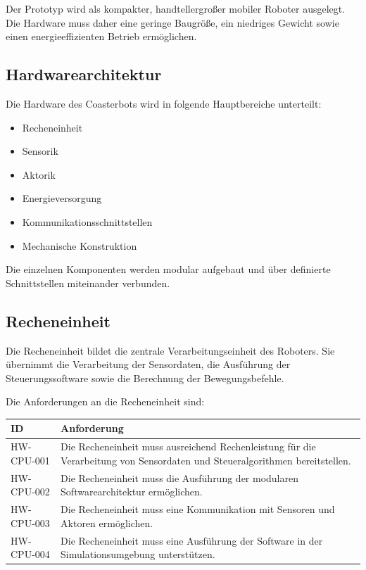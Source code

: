 Der Prototyp wird als kompakter, handtellergroßer mobiler Roboter
ausgelegt. Die Hardware muss daher eine geringe Baugröße, ein niedriges
Gewicht sowie einen energieeffizienten Betrieb ermöglichen.

\subsection{Hardwarearchitektur}\label{hardwarearchitektur}

Die Hardware des Coasterbots wird in folgende Hauptbereiche unterteilt:

\begin{itemize}
\tightlist
\item
  Recheneinheit
\item
  Sensorik
\item
  Aktorik
\item
  Energieversorgung
\item
  Kommunikationsschnittstellen
\item
  Mechanische Konstruktion
\end{itemize}

Die einzelnen Komponenten werden modular aufgebaut und über definierte
Schnittstellen miteinander verbunden.

\subsection{Recheneinheit}\label{recheneinheit}

Die Recheneinheit bildet die zentrale Verarbeitungseinheit des Roboters.
Sie übernimmt die Verarbeitung der Sensordaten, die Ausführung der
Steuerungssoftware sowie die Berechnung der Bewegungsbefehle.

Die Anforderungen an die Recheneinheit sind:

\begin{longtable}[]{@{}
  >{\raggedright\arraybackslash}p{}
  >{\raggedright\arraybackslash}p{}@{}}
\toprule\noalign{}
\begin{minipage}[b]{\linewidth}\raggedright
ID
\end{minipage} & \begin{minipage}[b]{\linewidth}\raggedright
Anforderung
\end{minipage} \\
\midrule\noalign{}
\endhead
\bottomrule\noalign{}
\endlastfoot
HW-CPU-001 & Die Recheneinheit muss ausreichend Rechenleistung für die
Verarbeitung von Sensordaten und Steueralgorithmen bereitstellen. \\
HW-CPU-002 & Die Recheneinheit muss die Ausführung der modularen
Softwarearchitektur ermöglichen. \\
HW-CPU-003 & Die Recheneinheit muss eine Kommunikation mit Sensoren und
Aktoren ermöglichen. \\
HW-CPU-004 & Die Recheneinheit muss eine Ausführung der Software in der
Simulationsumgebung unterstützen. \\
\end{longtable}

